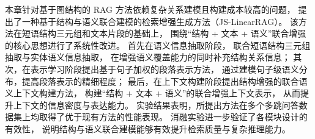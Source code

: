 本章针对基于图结构的 RAG 方法依赖复杂关系建模且构建成本较高的问题，
提出了一种基于结构与语义联合建模的检索增强生成方法（JS-LinearRAG）。
该方法在短语结构三元组和文本片段的基础上，
围绕“结构 + 文本 + 语义”联合增强的核心思想进行了系统性改进。
首先在语义信息抽取阶段，
联合短语结构三元组抽取与实体语义信息抽取，
在增强语义覆盖能力的同时补充结构关系信息；
其次，在表示学习阶段提出基于句子加权的段落表示方法，
通过建模句子级语义分布，提高段落表示的精细程度；
最后，在上下文构建阶段提出结构增强的联合语义上下文构建方法，
构建“结构 + 文本 + 语义”的联合增强上下文表示，
从而提升上下文的信息密度与表达能力。
实验结果表明，所提出方法在多个多跳问答数据集上均取得了优于现有方法的性能表现。
消融实验进一步验证了各模块设计的有效性，
说明结构与语义联合建模能够有效提升检索质量与复杂推理能力。
